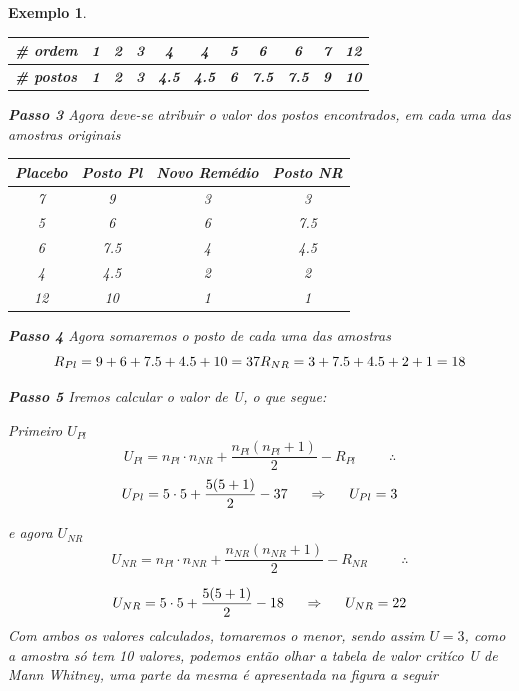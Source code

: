 \documentclass[
]{book}
\newtheorem{example}{Exemplo}
\begin{document}
\begin{example}
\begin{longtable}[]{@{}lcccccccccc@{}}
\toprule
\textbf{\# ordem} & \textbf{1} & \textbf{2} & \textbf{3} & \textbf{4} & \textbf{4} & \textbf{5} & \textbf{6} & \textbf{6} & \textbf{7} & \textbf{12} \\
\midrule
\endhead
\textbf{\# postos} & \textbf{1} & \textbf{2} & \textbf{3} & \textbf{4.5} & \textbf{4.5} & \textbf{6} & \textbf{7.5} & \textbf{7.5} & \textbf{9} & \textbf{10} \\
\bottomrule
\end{longtable}

\textbf{Passo 3} Agora deve-se atribuir o valor dos postos encontrados, em cada uma das amostras originais

\begin{longtable}[]{@{}cccc@{}}
\toprule
\textbf{Placebo} & \textbf{Posto Pl} & \textbf{Novo Remédio} & \textbf{Posto NR} \\
\midrule
\endhead
7 & 9 & 3 & 3 \\
5 & 6 & 6 & 7.5 \\
6 & 7.5 & 4 & 4.5 \\
4 & 4.5 & 2 & 2 \\
12 & 10 & 1 & 1 \\
\bottomrule
\end{longtable}

\textbf{Passo 4} Agora somaremos o posto de cada uma das amostras
\[
R_{Pl} = 9 + 6 + 7.5 + 4.5 + 10 = 37\\
R_{NR} = 3 + 7.5 + 4.5 + 2 + 1 = 18
\]

\textbf{Passo 5} Iremos calcular o valor de U, o que segue:

Primeiro \(U_{Pl}\)
\[
U_{Pl} = n_{Pl} \cdot n_{NR} + \frac{n_{Pl}(n_{Pl}+1)}{2} - R_{Pl} \hspace{1cm} \therefore 
\]
\[
U_{Pl} = 5 \cdot 5 + \frac{5(5+1)}{2} - 37 \hspace{.5cm} \Rightarrow \hspace{.5cm} U_{Pl} = 3 
\]

e agora \(U_{NR}\)
\[
U_{NR} = n_{Pl} \cdot n_{NR} + \frac{n_{NR}(n_{NR}+1)}{2} - R_{NR} \hspace{1cm} \therefore 
\]

\[
U_{NR} = 5 \cdot 5 + \frac{5(5+1)}{2} - 18 \hspace{.5cm} \Rightarrow \hspace{.5cm} U_{NR} = 22 
\]
Com ambos os valores calculados, tomaremos o menor, sendo assim \(U = 3\), como a amostra só tem 10 valores, podemos então olhar a tabela de valor critíco U de Mann Whitney, uma parte da mesma é apresentada na figura a seguir


\end{example}
\end{document}
